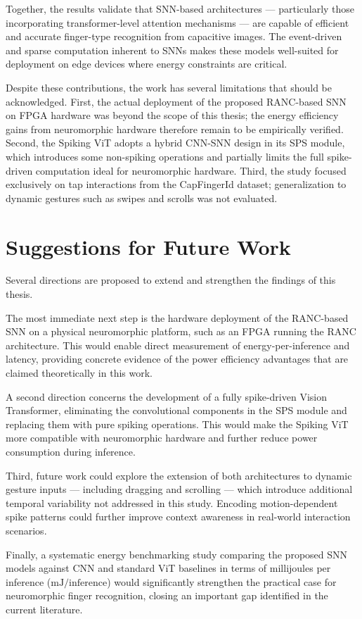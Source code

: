 \documentclass[../main.tex]{subfiles}
\begin{document}
Together, the results validate that SNN-based architectures --- particularly those
incorporating transformer-level attention mechanisms --- are capable of efficient and
accurate finger-type recognition from capacitive images. The event-driven and
sparse computation inherent to SNNs makes these models well-suited for deployment
on edge devices where energy constraints are critical.

Despite these contributions, the work has several limitations that should be
acknowledged. First, the actual deployment of the proposed RANC-based SNN on
FPGA hardware was beyond the scope of this thesis; the energy efficiency gains from
neuromorphic hardware therefore remain to be empirically verified. Second, the
Spiking ViT adopts a hybrid CNN-SNN design in its SPS module, which introduces
some non-spiking operations and partially limits the full spike-driven computation
ideal for neuromorphic hardware. Third, the study focused exclusively on tap
interactions from the CapFingerId dataset; generalization to dynamic gestures such
as swipes and scrolls was not evaluated.

\section{Suggestions for Future Work}

Several directions are proposed to extend and strengthen the findings of this
thesis.

The most immediate next step is the hardware deployment of the RANC-based SNN
on a physical neuromorphic platform, such as an FPGA running the RANC
architecture. This would enable direct measurement of energy-per-inference and
latency, providing concrete evidence of the power efficiency advantages that are
claimed theoretically in this work.

A second direction concerns the development of a fully spike-driven Vision
Transformer, eliminating the convolutional components in the SPS module and
replacing them with pure spiking operations. This would make the Spiking ViT
more compatible with neuromorphic hardware and further reduce power consumption
during inference.

Third, future work could explore the extension of both architectures to dynamic
gesture inputs --- including dragging and scrolling --- which introduce additional
temporal variability not addressed in this study. Encoding motion-dependent spike
patterns could further improve context awareness in real-world interaction
scenarios.

Finally, a systematic energy benchmarking study comparing the proposed SNN
models against CNN and standard ViT baselines in terms of millijoules per
inference ($\text{mJ}/\text{inference}$) would significantly strengthen the
practical case for neuromorphic finger recognition, closing an important gap
identified in the current literature.
\end{document}
